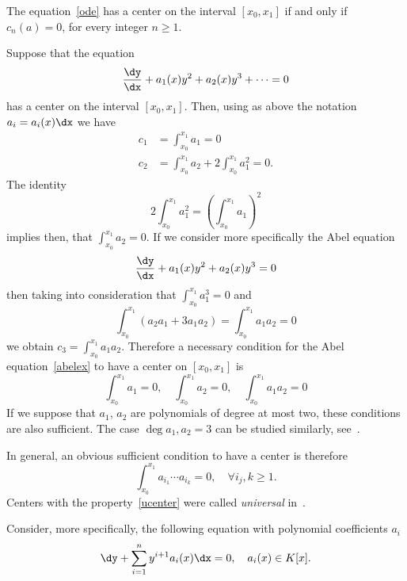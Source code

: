 \begin{coro}
The equation~\eqref{ode} has a center on the interval $[x_0,x_1]$ if and only if $c_n(a)=0$, for every integer $ n \geq 1$.
\end{coro}

\begin{exam}
Suppose that the equation
\[
\frac{\dy}{\dx} + a_1(x)y^2 + a_2(x)y^3 + \dots = 0
\]
has a center on the interval $[x_0,x_1]$. Then, using as above the notation $a_{i}= a_{i}(x) \dx $ we have
\begin{align*}
c_1&= \int_{x_0}^{x_1} a_1 = 0 \\
c_2& = \int_{x_0}^{x_1} a_2 + 2 \int_{x_0}^{x_1} a_1^2 = 0.
\end{align*}
The identity
\[
2 \int_{x_0}^{x_1} a_1^2 = \left(\int_{x_0}^{x_1} a_1\right)^2
\]
implies then, that $ \int_{x_0}^{x_1} a_2 = 0$.
If we consider more specifically the Abel equation
\begin{equation}\label{abelex}
\frac{\dy}{\dx} + a_1(x)y^2 + a_2(x)y^3 = 0
\end{equation}
then taking into consideration that $\int_{x_0}^{x_1} a_1^3 = 0$ and
\[
\int_{x_0}^{x_1} (a_2 a_1 + 3a_1a_2) = \int_{x_0}^{x_1} a_1 a_2 = 0
\]
we obtain $c_3= \int_{x_0}^{x_1} a_1 a_2 $. Therefore a necessary condition for the Abel equation~\eqref{abelex} to have a center on $[x_0,x_1]$ is
\begin{equation}\label{nc}
\int_{x_0}^{x_1} a_1 = 0,\quad \int_{x_0}^{x_1} a_2 = 0, \quad \int_{x_0}^{x_1} a_1 a_2 = 0
\end{equation}
If we suppose that $a_1$, $a_2$ are polynomials of degree at most two, these conditions are also sufficient. The case $\deg a_1, a_2 = 3$ can be studied similarly, see~\cite{bfy98,bfy99,bfy00}.
\end{exam}

In general, an obvious sufficient condition to have a center is therefore
\begin{equation}\label{ucenter}
\int_{x_0}^{x_1} a_{i_1} \cdots a_{i_k} = 0,\quad \forall i_j, k \geq 1.
\end{equation}
Centers with the property~\eqref{ucenter} were called \emph{universal} in~\cite{brud06}.

Consider, more specifically, the following equation with polynomial coefficients $a_i$
\begin{equation}\label{an}
\dy + \sum_{i=1}^n y^{i+1} a_i(x) \dx = 0,\quad a_i(x) \in K[x].
\end{equation}

